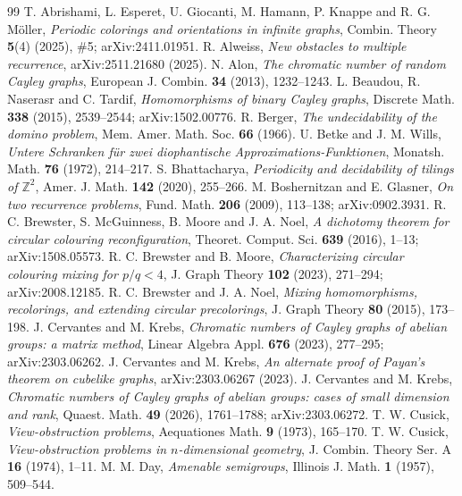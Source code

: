 \documentclass[11pt,a4paper]{amsart}
\theoremstyle{definition}
\newcommand{\Z}{\mathbb{Z}}
\begin{document}
\begin{thebibliography}{99}
 T. Abrishami, L. Esperet, U. Giocanti, M. Hamann, P. Knappe and R. G. M\"oller,
\emph{Periodic colorings and orientations in infinite graphs}, Combin. Theory \textbf{5}(4) (2025), \#5;
arXiv:2411.01951.
 R. Alweiss, \emph{New obstacles to multiple recurrence}, arXiv:2511.21680 (2025).
 N. Alon, \emph{The chromatic number of random Cayley graphs}, European J. Combin. \textbf{34}
(2013), 1232--1243.
 L. Beaudou, R. Naserasr and C. Tardif, \emph{Homomorphisms of binary Cayley graphs}, Discrete Math.
\textbf{338} (2015), 2539--2544; arXiv:1502.00776.
 R. Berger, \emph{The undecidability of the domino problem}, Mem. Amer. Math. Soc. \textbf{66} (1966).
 U. Betke and J. M. Wills, \emph{Untere Schranken f\"ur zwei diophantische
Approximations-Funktionen}, Monatsh. Math. \textbf{76} (1972), 214--217.
 S. Bhattacharya, \emph{Periodicity and decidability of tilings of $\Z^2$}, Amer. J. Math.
\textbf{142} (2020), 255--266.
 M. Boshernitzan and E. Glasner, \emph{On two recurrence problems}, Fund. Math. \textbf{206} (2009),
113--138; arXiv:0902.3931.
 R. C. Brewster, S. McGuinness, B. Moore and J. A. Noel, \emph{A dichotomy theorem for circular
colouring reconfiguration}, Theoret. Comput. Sci. \textbf{639} (2016), 1--13; arXiv:1508.05573.
 R. C. Brewster and B. Moore, \emph{Characterizing circular colouring mixing for $p/q<4$}, J. Graph
Theory \textbf{102} (2023), 271--294; arXiv:2008.12185.
 R. C. Brewster and J. A. Noel, \emph{Mixing homomorphisms, recolorings, and extending circular
precolorings}, J. Graph Theory \textbf{80} (2015), 173--198.
 J. Cervantes and M. Krebs, \emph{Chromatic numbers of Cayley graphs of abelian groups: a matrix
method}, Linear Algebra Appl. \textbf{676} (2023), 277--295; arXiv:2303.06262.
 J. Cervantes and M. Krebs, \emph{An alternate proof of Payan's theorem on cubelike graphs},
arXiv:2303.06267 (2023).
 J. Cervantes and M. Krebs, \emph{Chromatic numbers of Cayley graphs of abelian groups: cases of
small dimension and rank}, Quaest. Math. \textbf{49} (2026), 1761--1788; arXiv:2303.06272.
 T. W. Cusick, \emph{View-obstruction problems}, Aequationes Math. \textbf{9} (1973), 165--170.
 T. W. Cusick, \emph{View-obstruction problems in $n$-dimensional geometry}, J. Combin. Theory
Ser. A \textbf{16} (1974), 1--11.
 M. M. Day, \emph{Amenable semigroups}, Illinois J. Math. \textbf{1} (1957), 509--544.

\end{thebibliography}
\end{document}
